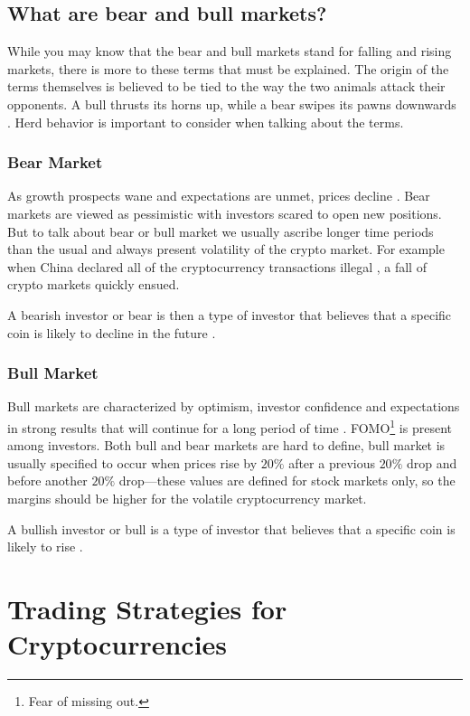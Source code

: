 \section{What are bear and bull markets?}
While you may know that the bear and bull markets stand for falling and rising markets, there is more to these terms that must be explained. The origin of the terms themselves is believed to be tied to the way the two animals attack their opponents. A bull thrusts its horns up, while a bear swipes its pawns downwards \cite{investopedia-bull-market}.
Herd behavior is important to consider when talking about the terms.

\subsection*{Bear Market}
As growth prospects wane and expectations are unmet, prices decline \cite{investopedia-bear-market}. Bear markets are viewed as pessimistic with investors scared to open new positions. But to talk about bear or bull market we usually ascribe longer time periods than the usual and always present volatility of the crypto market. For example when China declared all of the cryptocurrency transactions illegal \cite{china-ban}, a fall of crypto markets quickly ensued.

A bearish investor or bear is then a type of investor that believes that a specific coin is likely to decline in the future \cite{investopedia-bull}.

\subsection*{Bull Market}
Bull markets are characterized by optimism, investor confidence and expectations in strong results that will continue for a long period of time \cite{investopedia-bull-market}. FOMO\footnote{Fear of missing out.} is present among investors. Both bull and bear markets are hard to define, bull market is usually specified to occur when prices rise by $20\%$ after a previous $20\%$ drop and before another $20\%$ drop---these values are defined for stock markets only, so the margins should be higher for the volatile cryptocurrency market.

A bullish investor or bull is a type of investor that believes that a specific coin is likely to rise \cite{investopedia-bull}.

\chapter{Trading Strategies for Cryptocurrencies}
\label{trading-stategies}

